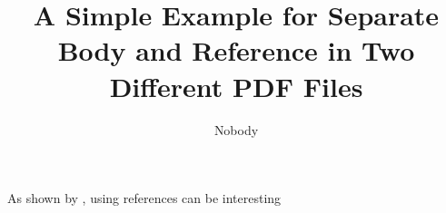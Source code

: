 \documentclass{article}
\title{A Simple Example for Separate Body and Reference in Two Different PDF Files}
\author{Nobody}
\begin{document}
\maketitle

As shown by \citet{author}, using references can be interesting

\newpage


\end{document}
